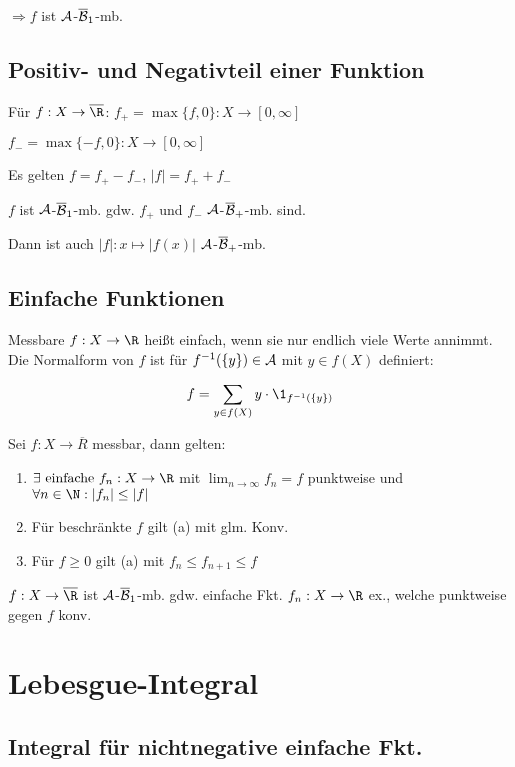 $\Rightarrow f$ ist $\mathcal{A}$-$\overline{\mathcal{B}}_1$-mb.

\subsection*{Positiv- und Negativteil einer Funktion}

Für $f : X \to \overline \R$: $f_+ = \max\{f,0\} : X \to [0, \infty]$

\hspace{20.1mm} $f_- = \max\{-f,0\} : X \to [0, \infty]$

Es gelten $f = f_+ - f_-$, $|f| = f_+ + f_-$

$f$ ist $\mathcal{A}$-$\overline{\mathcal{B}}_1$-mb. gdw. $f_+$ und $f_-$ $\mathcal{A}$-$\overline{\mathcal{B}}_+$-mb. sind.

Dann ist auch $|f| : x \mapsto |f(x)|$ $\mathcal{A}$-$\overline{\mathcal{B}}_+$-mb.

\subsection*{Einfache Funktionen}

Messbare $f : X \to \R$ heißt einfach, wenn sie nur endlich viele Werte annimmt. Die Normalform von $f$ ist für $f^{-1}(\{y\}) \in \mathcal{A}$ mit $y \in f(X)$ definiert:

\vspace{-2mm}
$$f = \sum_{y \in f(X)} y \cdot \1_{f^{-1}(\{y\})}$$

Sei $f : X \to \overline R$ messbar, dann gelten:

\begin{enumerate}[label=(\alph*)]
	\item $\exists \text{ einfache } f_n : X \to \R$ mit $\lim_{n \to \infty} f_n = f$ punktweise und $\forall n \in \N : |f_n| \leq |f|$
	\item Für beschränkte $f$ gilt (a) mit glm. Konv.
	\item Für $f \geq 0$ gilt (a) mit $f_n \leq f_{n+1} \leq f$
\end{enumerate}

$f : X \to \overline\R$ ist $\mathcal{A}$-$\overline{\mathcal{B}}_1$-mb. gdw. einfache Fkt. $f_n : X \to \R$ ex., welche punktweise gegen $f$ konv.

\section*{Lebesgue-Integral}

\subsection*{Integral für nichtnegative einfache Fkt.}

